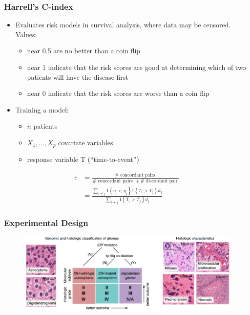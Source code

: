 \documentclass[usenames,dvipsnames]{beamer}
\begin{document}
\begin{frame}
  \frametitle{Harrell's C-index}
  \begin{itemize}
    \item Evaluates risk models in survival analysis, where data may be
    censored. Values:
    \begin{itemize}
      \item near 0.5 are no better than a coin flip
      \item near 1 indicate that the risk scores are good at determining which
      of two patients will have the disease first
      \item near 0 indicate that the risk scores are worse than a coin flip
    \end{itemize}
    \item Training a model:
    \begin{itemize}
      \item $n$ patients
      \item $X_{1},\ldots,X_{p}$ covariate variables
      \item response variable T (``time-to-event'')
    \end{itemize}
  \end{itemize}
  \vspace{0.5cm}
  \begin{align*}
    c&=\frac{\# \text { concordant pairs }}{\# \text { concordant pairs }+\# \text { discordant pair }}\\[0.5cm]
    &=\frac{\sum_{i \neq j} 1\left\{\eta_{i}<\eta_{j}\right\} 1\left\{T_{i}>T_{j}\right\} d_{j}}{\sum_{i \neq j} 1\left\{T_{i}>T_{j}\right\} d_{j}}
  \end{align*}
\end{frame}
\begin{frame}
  \frametitle{Experimental Design}
  \begin{figure}[ht]
    \centering
    \includegraphics[width=1.0\textwidth]{figures/exp_design.png}
    \caption*{\label{fig:exp-design}}
  \end{figure}
\end{frame}
\end{document}
